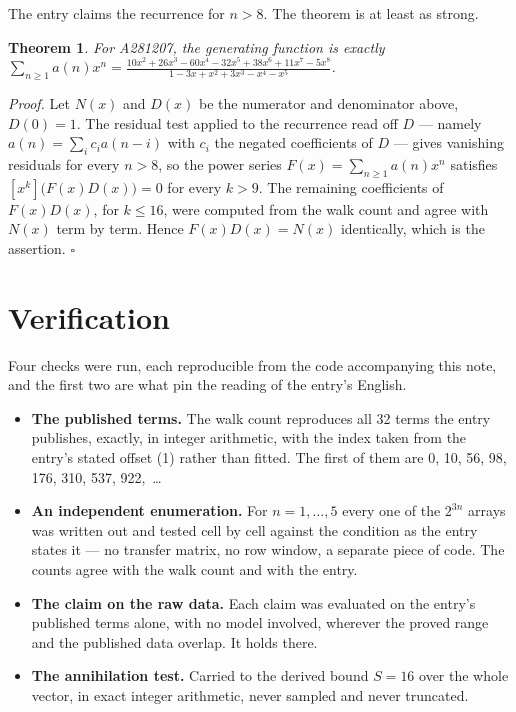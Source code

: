 \documentclass[11pt]{article}
\newtheorem{theorem}{Theorem}
\theoremstyle{definition}
\begin{document}
The entry claims the recurrence for $n > 8$. The theorem is at least as strong.

\begin{theorem} For A281207, the generating function is exactly $\sum_{n\ge 1} a(n)x^n = \frac{10x^{2} + 26x^{3} - 60x^{4} - 32x^{5} + 38x^{6} + 11x^{7} - 5x^{8}}{1 - 3x + x^{2} + 3x^{3} - x^{4} - x^{5}}$.\end{theorem}

{\itshape Proof.} Let $N(x)$ and $D(x)$ be the numerator and denominator above, $D(0)=1$. The residual test applied to the recurrence read off $D$ --- namely $a(n) = \sum_i c_i a(n-i)$ with $c_i$ the negated coefficients of $D$ --- gives vanishing residuals for every $n > 8$, so the power series $F(x)=\sum_{n\ge 1}a(n)x^n$ satisfies $[x^k]\bigl(F(x)D(x)\bigr) = 0$ for every $k > 9$. The remaining coefficients of $F(x)D(x)$, for $k \le 16$, were computed from the walk count and agree with $N(x)$ term by term. Hence $F(x)D(x) = N(x)$ identically, which is the assertion. $\square$

\section{Verification}

Four checks were run, each reproducible from the code accompanying this note, and the first two are what pin the reading of the entry's English.

\begin{itemize}

\item {\bfseries The published terms.} The walk count reproduces all 32 terms the entry publishes, exactly, in integer arithmetic, with the index taken from the entry's stated offset (1) rather than fitted. The first of them are 0, 10, 56, 98, 176, 310, 537, 922,~\dots

\item {\bfseries An independent enumeration.} For $n = 1,\dots,5$ every one of the $2^{3n}$ arrays was written out and tested cell by cell against the condition as the entry states it --- no transfer matrix, no row window, a separate piece of code. The counts agree with the walk count and with the entry.

\item {\bfseries The claim on the raw data.} Each claim was evaluated on the entry's published terms alone, with no model involved, wherever the proved range and the published data overlap. It holds there.

\item {\bfseries The annihilation test.} Carried to the derived bound $S = 16$ over the whole vector, in exact integer arithmetic, never sampled and never truncated.

\end{itemize}
\end{document}
